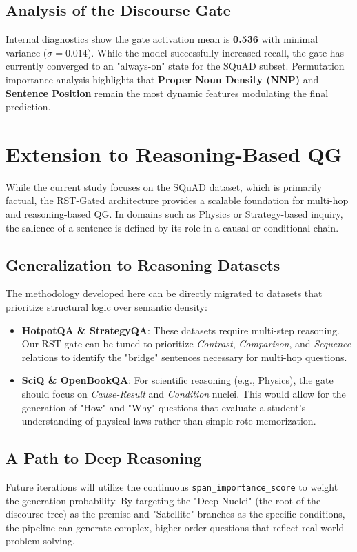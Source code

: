 \documentclass[11pt,a4paper]{article}
\begin{document}
\subsection{Analysis of the Discourse Gate}
Internal diagnostics show the gate activation mean is \textbf{0.536} with minimal variance ($\sigma=0.014$). While the model successfully increased recall, the gate has currently converged to an "always-on" state for the SQuAD subset. Permutation importance analysis highlights that \textbf{Proper Noun Density (NNP)} and \textbf{Sentence Position} remain the most dynamic features modulating the final prediction.

\section{Extension to Reasoning-Based QG}
While the current study focuses on the SQuAD dataset, which is primarily factual, the RST-Gated architecture provides a scalable foundation for multi-hop and reasoning-based QG. In domains such as Physics or Strategy-based inquiry, the salience of a sentence is defined by its role in a causal or conditional chain.

\subsection{Generalization to Reasoning Datasets}
The methodology developed here can be directly migrated to datasets that prioritize structural logic over semantic density:
\begin{itemize}
    \item \textbf{HotpotQA \& StrategyQA}: These datasets require multi-step reasoning. Our RST gate can be tuned to prioritize \textit{Contrast}, \textit{Comparison}, and \textit{Sequence} relations to identify the "bridge" sentences necessary for multi-hop questions.
    \item \textbf{SciQ \& OpenBookQA}: For scientific reasoning (e.g., Physics), the gate should focus on \textit{Cause-Result} and \textit{Condition} nuclei. This would allow for the generation of "How" and "Why" questions that evaluate a student's understanding of physical laws rather than simple rote memorization.
\end{itemize}

\subsection{A Path to Deep Reasoning}
Future iterations will utilize the continuous \texttt{span\_importance\_score} to weight the generation probability. By targeting the "Deep Nuclei" (the root of the discourse tree) as the premise and "Satellite" branches as the specific conditions, the pipeline can generate complex, higher-order questions that reflect real-world problem-solving.
\end{document}
